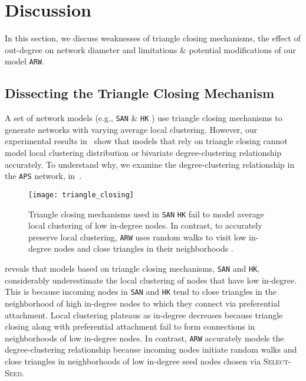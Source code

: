 
\section{Discussion}
\label{sec:Discussion}
In this section, we discuss weaknesses of triangle closing mechanisms,
the effect of out-degree on network diameter and limitations \& potential
modifications of our model \texttt{ARW}.

\subsection{Dissecting the Triangle Closing Mechanism}
\label{ss:tc}

A set of network models (e.g., \texttt{SAN} \cite{gong2012evolution} \& \texttt{HK} \cite{holme2002growing})
use triangle closing mechanisms to generate networks with
varying average local clustering. However, our experimental results
in~ show that models that rely on triangle closing
cannot model local clustering distribution or bivariate degree-clustering
relationship accurately. To understand why, we examine the degree-clustering
relationship in the \texttt{APS} network, in~.
\begin{figure}[h]
    \centering
    \texttt{[image: triangle\_closing]}
    \caption{Triangle closing mechanisms used in \texttt{SAN} \texttt{HK} fail to
    model average local clustering of low in-degree nodes. In contrast,
    to accurately preserve local clustering, \texttt{ARW} uses {random walks} to visit
    low in-degree nodes and close triangles in their neighborhoods .}
    \label{fig:triangle_closing}
\end{figure}

 reveals that models based on triangle closing mechanisms,
\texttt{SAN} and \texttt{HK}, considerably underestimate the local clustering of
nodes that have low in-degree. This is because incoming nodes in \texttt{SAN} and \texttt{HK}
tend to close triangles in the neighborhood of high in-degree nodes to which they
connect via preferential attachment. Local clustering plateaus as in-degree decreases because
triangle closing along with preferential attachment fail to form connections in neighborhoods
of low in-degree nodes. In contrast, \texttt{ARW} accurately models the degree-clustering relationship
because incoming nodes initiate random walks and close triangles in neighborhoods of low in-degree
seed nodes chosen via \textsc{Select-Seed}.

